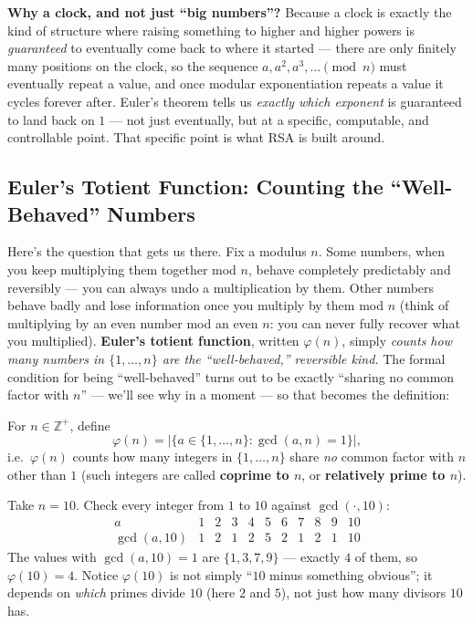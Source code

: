 \medskip\noindent\textbf{Why a clock, and not just ``big numbers''?} Because a clock is exactly the kind of structure where raising something to higher and higher powers is \emph{guaranteed} to eventually come back to where it started — there are only finitely many positions on the clock, so the sequence $a, a^2, a^3,\dots \pmod n$ must eventually repeat a value, and once modular exponentiation repeats a value it cycles forever after. Euler's theorem tells us \emph{exactly which exponent} is guaranteed to land back on $1$ — not just eventually, but at a specific, computable, and controllable point. That specific point is what RSA is built around.

\subsection{Euler's Totient Function: Counting the ``Well-Behaved'' Numbers}

Here's the question that gets us there. Fix a modulus $n$. Some numbers, when you keep multiplying them together mod $n$, behave completely predictably and reversibly — you can always undo a multiplication by them. Other numbers behave badly and lose information once you multiply by them mod $n$ (think of multiplying by an even number mod an even $n$: you can never fully recover what you multiplied). \textbf{Euler's totient function}, written $\varphi(n)$, simply \emph{counts how many numbers in $\{1,\dots,n\}$ are the ``well-behaved,'' reversible kind.} The formal condition for being ``well-behaved'' turns out to be exactly ``sharing no common factor with $n$'' — we'll see why in a moment — so that becomes the definition:

\begin{definition}
For $n \in \mathbb{Z}^{+}$, define
\[
\varphi(n) = |\{a \in \{1, \dots, n\} : \gcd(a,n) = 1\}|,
\]
i.e.\ $\varphi(n)$ counts how many integers in $\{1,\dots,n\}$ share \emph{no} common factor with $n$ other than $1$ (such integers are called \textbf{coprime to $n$}, or \textbf{relatively prime to $n$}).
\end{definition}

\begin{example}
Take $n=10$. Check every integer from $1$ to $10$ against $\gcd(\cdot,10)$:
\[
\begin{array}{c|cccccccccc}
a & 1 & 2 & 3 & 4 & 5 & 6 & 7 & 8 & 9 & 10\\
\hline
\gcd(a,10) & 1 & 2 & 1 & 2 & 5 & 2 & 1 & 2 & 1 & 10
\end{array}
\]
The values with $\gcd(a,10)=1$ are $\{1,3,7,9\}$ — exactly $4$ of them, so $\varphi(10)=4$. Notice $\varphi(10)$ is not simply ``$10$ minus something obvious''; it depends on \emph{which} primes divide $10$ (here $2$ and $5$), not just how many divisors $10$ has.
\end{example}

